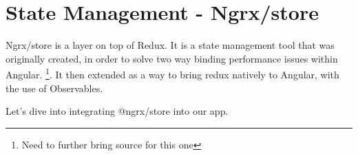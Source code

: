 \maketitle{}
\section{ State Management - Ngrx/store }

Ngrx/store is a layer on top of Redux. It is a state management tool that was
originally created, in order to solve two way binding performance issues within
Angular. \footnote{Need to further bring source for this one}. It then extended
as a way to bring redux natively to Angular, with the use of Observables.

Let's dive into integrating @ngrx/store into our app. 
